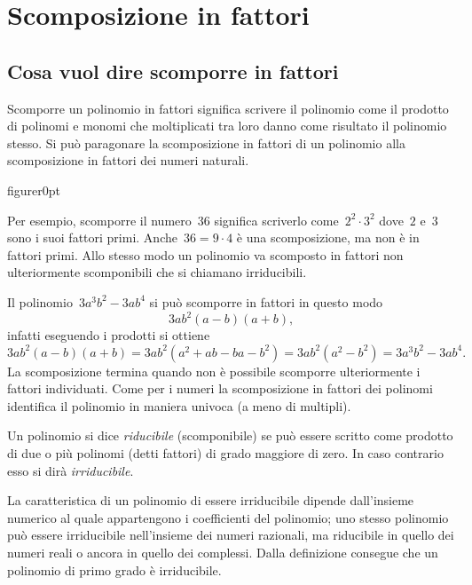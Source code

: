 
\chapter{Scomposizione in fattori}

\section{Cosa vuol dire scomporre in fattori}
Scomporre un polinomio in fattori significa scrivere il polinomio come il prodotto di polinomi e monomi che
moltiplicati tra loro danno come risultato il polinomio stesso. Si può paragonare la scomposizione in fattori
di un polinomio alla scomposizione in fattori dei numeri naturali.

\begin{wrapfloat}{figure}{r}{0pt}
 
\end{wrapfloat}

Per esempio, scomporre il numero~$36$ significa scriverlo come~$2^{2}\cdot 3^{2}$ dove~$2$ e~$3$ sono i suoi fattori primi.
Anche~$36 = 9 \cdot 4$ è una scomposizione, ma non è in fattori primi. Allo stesso modo un polinomio va scomposto in fattori non ulteriormente
scomponibili che si chiamano irriducibili. %

Il polinomio~$3a^{3}b^{2}-3ab^{4}$ si può scomporre in fattori in questo modo \[3ab^{2}(a-b)(a+b)\text{,}\] infatti eseguendo i prodotti si
ottiene \[3ab^{2}(a-b)(a+b)=3ab^{2}(a^{2}+ab-ba-b^{2})=3ab^{2}\left(a^{2}-b^{2}\right)=3a^{3}b^{2}-3ab^{4}.\]
La scomposizione termina quando non è possibile scomporre ulteriormente i fattori individuati.
Come per i numeri la scomposizione in fattori dei polinomi identifica il polinomio in maniera univoca (a meno di multipli).

\begin{definizione}
Un polinomio si dice \emph{riducibile} (scomponibile) se può essere scritto come prodotto di due o più polinomi (detti fattori) di grado maggiore di zero.
In caso contrario esso si dirà \emph{irriducibile}.
\end{definizione}

La caratteristica di un polinomio di essere irriducibile dipende dall'insieme numerico al quale appartengono i coefficienti del polinomio;
uno stesso polinomio può essere irriducibile nell'insieme dei numeri razionali, ma riducibile in quello dei numeri reali o
ancora in quello dei complessi.
Dalla definizione consegue che un polinomio di primo grado è irriducibile.

